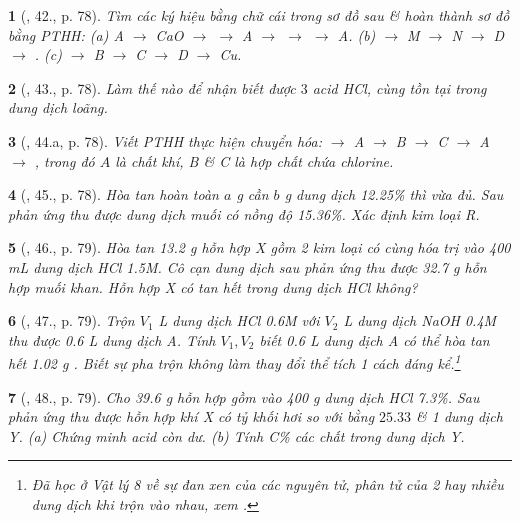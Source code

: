 \documentclass{article}
\newtheorem{baitoan}{}
\begin{document}
\begin{baitoan}[\cite{An_Hoa_Hoc_nang_cao_8_9}, 42., p. 78]
	Tìm các ký hiệu bằng chữ cái trong sơ đồ sau \& hoàn thành sơ đồ bằng PTHH: (a) {\rm A $\to$ CaO $\to$  $\to$ A $\to$  $\to$  $\to$ A}. (b) {\rm{} $\to$ M $\to$ N $\to$ D $\to$ }. (c) {\rm{} $\to$ B $\to$ C $\to$ D $\to$ Cu}.
\end{baitoan}

\begin{baitoan}[\cite{An_Hoa_Hoc_nang_cao_8_9}, 43., p. 78]
	Làm thế nào để nhận biết được $3$ acid {\rm HCl, } cùng tồn tại trong dung dịch loãng.	
\end{baitoan}

\begin{baitoan}[\cite{An_Hoa_Hoc_nang_cao_8_9}, 44.a, p. 78]
	Viết PTHH thực hiện chuyển hóa: {\rm{} $\to$ A $\to$ B $\to$ C $\to$ A $\to$ }, trong đó $A$ là chất khí, B \& C là hợp chất chứa chlorine.
\end{baitoan}

\begin{baitoan}[\cite{An_Hoa_Hoc_nang_cao_8_9}, 45., p. 78]
	Hòa tan hoàn toàn $a$ {\rm g } cần $b$ {\rm g} dung dịch {\rm{} 12.25\%} thì vừa đủ. Sau phản ứng thu được dung dịch muối có nồng độ {\rm15.36\%}. Xác định kim loại R.
\end{baitoan}

\begin{baitoan}[\cite{An_Hoa_Hoc_nang_cao_8_9}, 46., p. 79]
	Hòa tan {\rm13.2 g} hỗn hợp X gồm 2 kim loại có cùng hóa trị vào {\rm400 mL} dung dịch {\rm HCl 1.5M}. Cô cạn dung dịch sau phản ứng thu được {\rm32.7 g} hỗn hợp muối khan. Hỗn hợp X có tan hết trong dung dịch {\rm HCl} không?
\end{baitoan}

\begin{baitoan}[\cite{An_Hoa_Hoc_nang_cao_8_9}, 47., p. 79]
	Trộn $V_1$ {\rm L} dung dịch {\rm HCl 0.6M} với $V_2$ {\rm L} dung dịch {\rm NaOH 0.4M} thu được {\rm0.6 L} dung dịch A. Tính $V_1,V_2$ biết {\rm0.6 L} dung dịch A có thể hòa tan hết {\rm1.02 g }. Biết sự pha trộn không làm thay đổi thể tích 1 cách đáng kể.\footnote{Đã học ở Vật lý 8 về sự đan xen của các nguyên tử, phân tử của 2 hay nhiều dung dịch khi trộn vào nhau, xem \cite[\S19, pp. 68--70]{SGK_Vat_Ly_8}.}
\end{baitoan}

\begin{baitoan}[\cite{An_Hoa_Hoc_nang_cao_8_9}, 48., p. 79]
	Cho {\rm39.6 g} hỗn hợp gồm {\rm{}} vào {\rm400 g} dung dịch {\rm HCl 7.3\%}. Sau phản ứng thu được hỗn hợp khí X có tỷ khối hơi so với {\rm{}} bằng $25.33$ \& 1 dung dịch Y. (a) Chứng minh acid còn dư. (b) Tính C\% các chất trong dung dịch Y.
\end{baitoan}


\printbibliography[heading=bibintoc]
\end{document}
